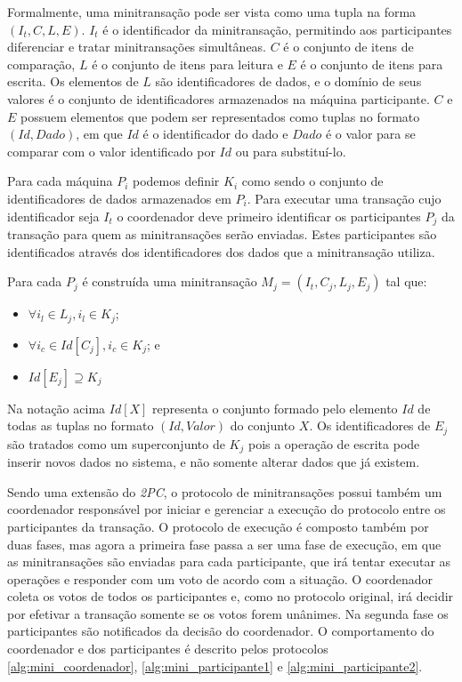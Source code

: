 \documentclass[11pt,twoside,a4paper]{book}
\begin{document}
Formalmente, uma minitransação pode ser vista como uma tupla na forma $(I_t, C, L, E)$. $I_t$ é o identificador da minitransação, permitindo aos participantes diferenciar e tratar minitransações simultâneas. \(C\) é o conjunto de itens de comparação, \(L\) é o conjunto de itens para leitura e \(E\) é o conjunto de itens para escrita. Os elementos de \(L\) são identificadores de dados, e o domínio de seus valores é o conjunto de identificadores armazenados na máquina participante. \(C\) e \(E\) possuem elementos que podem ser representados como tuplas no formato \((Id, Dado)\), em que \(Id\) é o identificador do dado e \(Dado\) é o valor para se comparar com o valor identificado por $Id$ ou para substituí-lo.

Para cada máquina \(P_i\) podemos definir \(K_i\) como sendo o conjunto de identificadores de dados armazenados em \(P_i\). Para executar uma transação cujo identificador seja \(I_t\) o coordenador deve primeiro identificar os participantes \(P_j\) da transação para quem as minitransações serão enviadas. Estes participantes são identificados através dos identificadores dos dados que a minitransação utiliza.

Para cada \(P_j\) é construída uma minitransação \(M_j = (I_t, C_j, L_j, E_j)\) tal que:

\begin{itemize}
\item $\forall i_l \in L_j, i_l \in K_j$;
\item $\forall i_c \in Id[C_j], i_c \in K_j$; e
\item $Id[E_j] \supseteq K_j$
\end{itemize}

Na notação acima $Id[X]$ representa o conjunto formado pelo elemento $Id$ de todas as tuplas no formato $(Id, Valor)$ do conjunto $X$. Os identificadores de $E_j$ são tratados como um superconjunto de $K_j$ pois a operação de escrita pode inserir novos dados no sistema, e não somente alterar dados que já existem.

Sendo uma extensão do \emph{2PC}, o protocolo de minitransações possui também um coordenador responsável por iniciar e gerenciar a execução do protocolo entre os participantes da transação. O protocolo de execução é composto também por duas fases, mas agora a primeira fase passa a ser uma fase de execução, em que as minitransações são enviadas para cada participante, que irá tentar executar as operações e responder com um voto de acordo com a situação. O coordenador coleta os votos de todos os participantes e, como no protocolo original, irá decidir por efetivar a transação somente se os votos forem unânimes. Na segunda fase os participantes são notificados da decisão do coordenador. O comportamento do coordenador e dos participantes é descrito pelos protocolos \ref{alg:mini_coordenador}, \ref{alg:mini_participante1} e \ref{alg:mini_participante2}.
\end{document}
